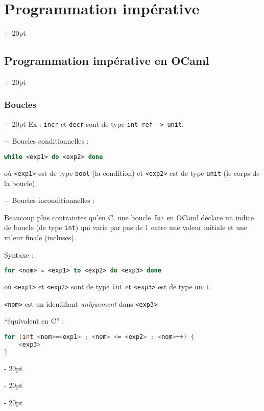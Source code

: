 \documentclass[a4paper, 12pt, twoside]{article}
\newcommand{\ind}[1][20pt]{\advance\leftskip + #1}
\newcommand{\deind}[1][20pt]{\advance\leftskip - #1}
\newenvironment{indentedenv}[1][20pt]{\par \ind[#1]}{\par \deind}
\newenvironment{indt}[2][20pt]{#2 \begin{indentedenv}[#1]}{\end{indentedenv}} %
\begin{document}
\begin{indt}{\section{Programmation impérative}}
\begin{indt}{\subsection{Programmation impérative en OCaml}}
\begin{indt}{\subsubsection{Boucles}}
                Ex : \texttt{incr} et \texttt{decr} sont de type \texttt{int ref -> unit}.
                
                $-$ Boucles conditionnelles :
                
                \vspace{6pt}
                
                \begin{lstlisting}[language=Caml, xleftmargin=80pt]
while <exp1> do <exp2> done\end{lstlisting}

                \vspace{6pt}
                
                où \texttt{<exp1>} est de type \texttt{bool} (la condition) et \texttt{<exp2>} est de type \texttt{unit} (le corps de la boucle).
                
                \vspace{6pt}
                
                $-$ Boucles inconditionnelles :
                
                Beaucoup plus contraintes qu'en C, une boucle \texttt{for} en OCaml déclare un indice de boucle (de type \texttt{int}) qui varie par pas de 1 entre une valeur initiale et une valeur finale (incluses).
                
                Syntaxe :
                
                \vspace{6pt}
                
                \begin{lstlisting}[language=Caml, xleftmargin=80pt]
for <nom> = <exp1> to <exp2> do <exp3> done\end{lstlisting}
                
                où \texttt{<exp1>} et \texttt{<exp2>} sont de type \texttt{int} et \texttt{<exp3>} est de type \texttt{unit}.
                
                \texttt{<nom>} est un identifiant \textit{uniquement} dans \texttt{<exp3>}
                
                ``équivalent en C'' :
                
                \vspace{6pt}
                
                \begin{lstlisting}[language=C, xleftmargin=80pt]
for (int <nom>=<exp1> ; <nom> <= <exp2> ; <nom>++) {
    <exp3>
}\end{lstlisting}
                

\end{indt}
\end{indt}
\end{indt}
\end{document}
